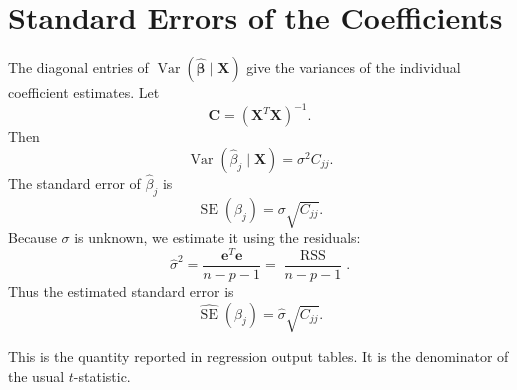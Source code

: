 \section{Standard Errors of the Coefficients}

The diagonal entries of \(\operatorname{Var}(\widehat{\boldsymbol{\beta}}\mid\mathbf{X})\) give the variances of the individual coefficient estimates.  Let
\begin{equation}
  \mathbf{C}=(\mathbf{X}^T\mathbf{X})^{-1}.
\end{equation}
Then
\begin{equation}
  \operatorname{Var}(\widehat{\beta}_j\mid\mathbf{X})=\sigma^2 C_{jj}.
\end{equation}
The standard error of \(\widehat{\beta}_j\) is
\begin{equation}
  \operatorname{SE}(\widehat{\beta}_j)=\sigma\sqrt{C_{jj}}.
\end{equation}
Because \(\sigma\) is unknown, we estimate it using the residuals:
\begin{equation}
  \widehat{\sigma}^2
  =\frac{\mathbf{e}^T\mathbf{e}}{n-p-1}
  =\frac{\operatorname{RSS}}{n-p-1}.
\end{equation}
Thus the estimated standard error is
\begin{equation}
  \boxed{
  \widehat{\operatorname{SE}}(\widehat{\beta}_j)
  =\widehat{\sigma}\sqrt{C_{jj}}.
  }
\end{equation}

This is the quantity reported in regression output tables.  It is the denominator of the usual \(t\)-statistic.

